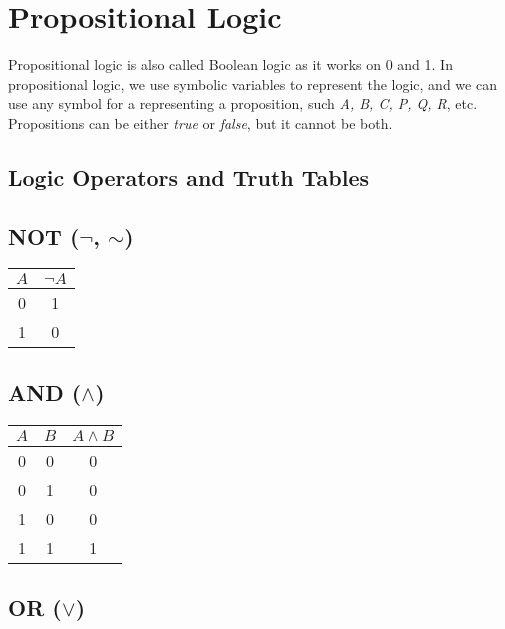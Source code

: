 \section{Propositional Logic}
Propositional logic is also called Boolean logic as it works on 0 and 1. In propositional logic, we use symbolic variables to represent the logic, and we can use any symbol for a representing a proposition, such \textit{A, B, C, P, Q, R}, etc. Propositions can be either \textit{true} or \textit{false}, but it cannot be both.

\subsection{Logic Operators and Truth Tables}
\smallskip
\begin{multicols}{2}

	\subsection*{NOT ($\neg$, $\sim$)}

	\begin{tabular}{cc}
		\toprule
		$A$ & $\neg A$ \\
		\midrule
		0   & 1        \\
		1   & 0        \\
		\bottomrule
	\end{tabular}

	\vspace{1em}

	\subsection*{AND ($\land$)}

	\begin{tabular}{ccc}
		\toprule
		$A$ & $B$ & $A \land B$ \\
		\midrule
		0   & 0   & 0           \\
		0   & 1   & 0           \\
		1   & 0   & 0           \\
		1   & 1   & 1           \\
		\bottomrule
	\end{tabular}

	\vspace{1em}

	\subsection*{OR ($\lor$)}


\end{multicols}
